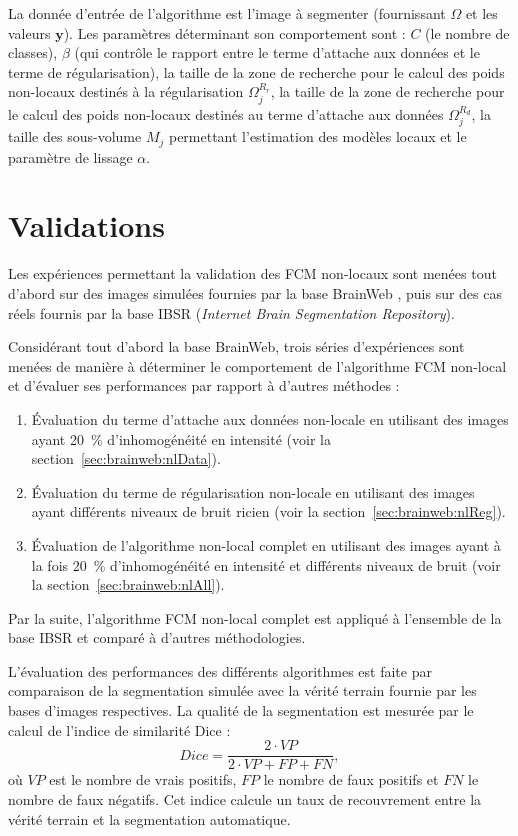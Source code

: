 La donnée d'entrée de l'algorithme est l'image à segmenter (fournissant $\Omega$ et les valeurs $\mathbf{y}$).
Les paramètres déterminant son comportement sont : $C$ (le nombre de classes), $\beta$ (qui contrôle le rapport entre le terme d'attache aux données et le terme de régularisation), la taille de la zone de recherche pour le calcul des poids non-locaux destinés à la régularisation $\Omega^{R_r}_j$, la taille de la zone de recherche pour le calcul des poids non-locaux destinés au terme d'attache aux données $\Omega^{R_d}_j$, la taille des sous-volume $M_j$ permettant l'estimation des modèles locaux et le paramètre de lissage $\alpha$.

\section{Validations}
\label{sec:nlfcm:validations}

Les expériences permettant la validation des FCM non-locaux sont menées tout d'abord sur des images simulées fournies par la base BrainWeb \cite{Cocosco:FMHB:1997, Kwann:VBC:1996}, puis sur des cas réels fournis par la base IBSR (\emph{Internet Brain Segmentation Repository}).

Considérant tout d'abord la base BrainWeb, trois séries d'expériences sont menées de manière à déterminer le comportement de l'algorithme FCM non-local et d'évaluer ses performances par rapport à d'autres méthodes :
\begin{enumerate}
        \item Évaluation du terme d'attache aux données non-locale en utilisant des images ayant 20~\% d'inhomogénéité en intensité (voir la section~\ref{sec:brainweb:nlData}).
        \item \'Evaluation du terme de régularisation non-locale en utilisant des images ayant différents niveaux de bruit ricien (voir la section~\ref{sec:brainweb:nlReg}).
        \item Évaluation de l'algorithme non-local complet en utilisant des images ayant à la fois 20~\% d'inhomogénéité en intensité et différents niveaux de bruit (voir la section~\ref{sec:brainweb:nlAll}).
\end{enumerate}
Par la suite, l'algorithme FCM non-local complet est appliqué à l'ensemble de la base IBSR et comparé à d'autres méthodologies.

L'évaluation des performances des différents algorithmes est faite par comparaison de la segmentation simulée avec la vérité terrain fournie par les bases d'images respectives.
La qualité de la segmentation est mesurée par le calcul de l'indice de similarité Dice : 
$$
Dice = \frac{2\cdotp VP}{2\cdotp VP + FP + FN},
$$
où $VP$ est le nombre de vrais positifs, $FP$ le nombre de faux positifs et $FN$ le nombre de faux négatifs.
Cet indice calcule un taux de recouvrement entre la vérité terrain et la segmentation automatique.

